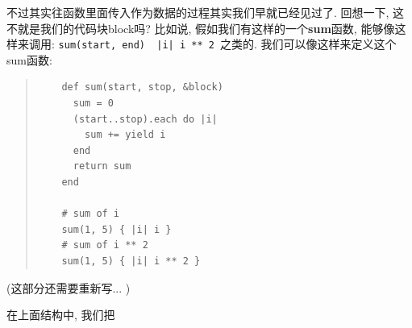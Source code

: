 % 
% 
% 
% 
%         

不过其实往函数里面传入作为数据的过程其实我们早就已经见过了. 回想一下, 这不就是我们的代码块block吗? 比如说, 假如我们有这样的一个\textbf{sum}函数, 能够像这样来调用: \texttt{sum(start, end) { |i| i ** 2 }}之类的. 我们可以像这样来定义这个sum函数: 

\begin{quotation}
  \begin{verbatim}
    def sum(start, stop, &block)
      sum = 0
      (start..stop).each do |i|
        sum += yield i
      end
      return sum
    end

    # sum of i
    sum(1, 5) { |i| i }
    # sum of i ** 2
    sum(1, 5) { |i| i ** 2 }
  \end{verbatim}
\end{quotation}

(这部分还需要重新写... )

在上面结构中, 我们把

